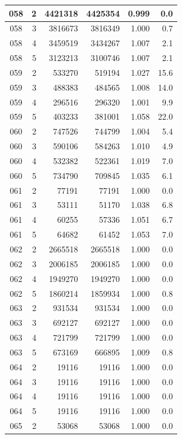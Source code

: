 \begin{longtable}{|c|r|r|r|r|r|}
\hline
058 & 2 & 4421318 & 4425354 & 0.999 & 0.0 \\
\hline
058 & 3 & 3816673 & 3816349 & 1.000 & 0.7 \\
\hline
058 & 4 & 3459519 & 3434267 & 1.007 & 2.1 \\
\hline
058 & 5 & 3123213 & 3100746 & 1.007 & 2.1 \\
\hline
059 & 2 & 533270 & 519194 & 1.027 & 15.6 \\
\hline
059 & 3 & 488383 & 484565 & 1.008 & 14.0 \\
\hline
059 & 4 & 296516 & 296320 & 1.001 & 9.9 \\
\hline
059 & 5 & 403233 & 381001 & 1.058 & 22.0 \\
\hline
060 & 2 & 747526 & 744799 & 1.004 & 5.4 \\
\hline
060 & 3 & 590106 & 584263 & 1.010 & 4.9 \\
\hline
060 & 4 & 532382 & 522361 & 1.019 & 7.0 \\
\hline
060 & 5 & 734790 & 709845 & 1.035 & 6.1 \\
\hline
061 & 2 & 77191 & 77191 & 1.000 & 0.0 \\
\hline
061 & 3 & 53111 & 51170 & 1.038 & 6.8 \\
\hline
061 & 4 & 60255 & 57336 & 1.051 & 6.7 \\
\hline
061 & 5 & 64682 & 61452 & 1.053 & 7.0 \\
\hline
062 & 2 & 2665518 & 2665518 & 1.000 & 0.0 \\
\hline
062 & 3 & 2006185 & 2006185 & 1.000 & 0.0 \\
\hline
062 & 4 & 1949270 & 1949270 & 1.000 & 0.0 \\
\hline
062 & 5 & 1860214 & 1859934 & 1.000 & 0.8 \\
\hline
063 & 2 & 931534 & 931534 & 1.000 & 0.0 \\
\hline
063 & 3 & 692127 & 692127 & 1.000 & 0.0 \\
\hline
063 & 4 & 721799 & 721799 & 1.000 & 0.0 \\
\hline
063 & 5 & 673169 & 666895 & 1.009 & 0.8 \\
\hline
064 & 2 & 19116 & 19116 & 1.000 & 0.0 \\
\hline
064 & 3 & 19116 & 19116 & 1.000 & 0.0 \\
\hline
064 & 4 & 19116 & 19116 & 1.000 & 0.0 \\
\hline
064 & 5 & 19116 & 19116 & 1.000 & 0.0 \\
\hline
065 & 2 & 53068 & 53068 & 1.000 & 0.0 \\

\end{longtable}
